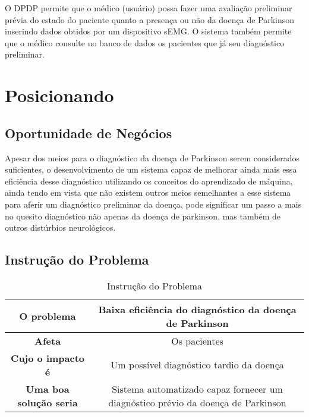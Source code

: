 \begin{anexosenv}
O DPDP permite que o médico (usuário) possa fazer uma avaliação preliminar prévia do estado do paciente quanto a presença ou não da doença de Parkinson inserindo dados obtidos por um dispositivo sEMG. O sistema também permite que o médico consulte no banco de dados os pacientes que já seu diagnóstico preliminar.

\section{Posicionando}

\subsection{Oportunidade de Negócios}

Apesar dos meios para o diagnóstico da doença de Parkinson serem considerados suficientes, o desenvolvimento de um sistema capaz de melhorar ainda mais essa eficiência desse diagnóstico utilizando os conceitos do aprendizado de máquina, ainda tendo em vista que não existem outros meios semelhantes a esse sistema para aferir um diagnóstico preliminar da doença, pode significar um passo a mais no quesito diagnóstico não apenas da doença de parkinson, mas também de outros distúrbios neurológicos.

\subsection{Instrução do Problema}

    \begin{table}[]
        \centering
        \caption{Instrução do Problema}
        \begin{tabular}{|c|c|}
        \hline
        \textbf{O problema}            & Baixa eficiência do diagnóstico da doença de Parkinson                           \\ \hline
        \textbf{Afeta}                 & Os pacientes                                                                     \\ \hline
        \textbf{Cujo o impacto é}      & Um possível diagnóstico tardio da doença                                         \\ \hline
        \textbf{Uma boa solução seria} & Sistema automatizado capaz fornecer um diagnóstico prévio da doença de Parkinson \\ \hline
        \end{tabular}
        \label{table:Instrução do Problema}
    \end{table}


\end{anexosenv}
